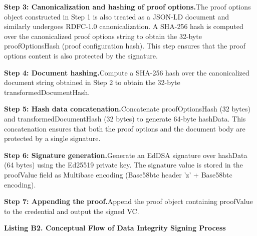\textbf{Step 3: Canonicalization and hashing of proof options.}The proof options object constructed in Step 1 is also treated as a JSON-LD document and similarly undergoes RDFC-1.0 canonicalization. A SHA-256 hash is computed over the canonicalized proof options string to obtain the 32-byte proofOptionsHash (proof configuration hash). This step ensures that the proof options content is also protected by the signature.

\textbf{Step 4: Document hashing.}Compute a SHA-256 hash over the canonicalized document string obtained in Step 2 to obtain the 32-byte transformedDocumentHash.

\textbf{Step 5: Hash data concatenation.}Concatenate proofOptionsHash (32 bytes) and transformedDocumentHash (32 bytes) to generate 64-byte hashData. This concatenation ensures that both the proof options and the document body are protected by a single signature.

\textbf{Step 6: Signature generation.}Generate an EdDSA signature over hashData (64 bytes) using the Ed25519 private key. The signature value is stored in the proofValue field as Multibase encoding (Base58btc header 'z' + Base58btc encoding).

\textbf{Step 7: Appending the proof.}Append the proof object containing proofValue to the credential and output the signed VC.

\textbf{Listing B2. Conceptual Flow of Data Integrity Signing Process}

